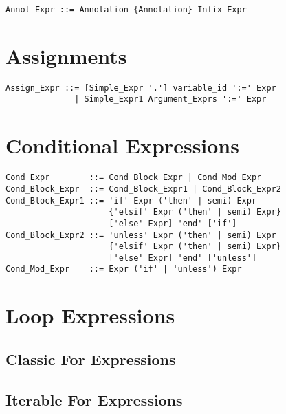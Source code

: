 \syntax\begin{lstlisting}
Annot_Expr ::= Annotation {Annotation} Infix_Expr
\end{lstlisting}








\section{Assignments}

\syntax\begin{lstlisting}
Assign_Expr ::= [Simple_Expr '.'] variable_id ':=' Expr
              | Simple_Expr1 Argument_Exprs ':=' Expr
\end{lstlisting}








\section{Conditional Expressions}

\syntax\begin{lstlisting}
Cond_Expr        ::= Cond_Block_Expr | Cond_Mod_Expr
Cond_Block_Expr  ::= Cond_Block_Expr1 | Cond_Block_Expr2
Cond_Block_Expr1 ::= 'if' Expr ('then' | semi) Expr 
                     {'elsif' Expr ('then' | semi) Expr}
                     ['else' Expr] 'end' ['if']
Cond_Block_Expr2 ::= 'unless' Expr ('then' | semi) Expr 
                     {'elsif' Expr ('then' | semi) Expr}
                     ['else' Expr] 'end' ['unless']
Cond_Mod_Expr    ::= Expr ('if' | 'unless') Expr
\end{lstlisting}








\section{Loop Expressions}

\subsection{Classic For Expressions}

\subsection{Iterable For Expressions}

